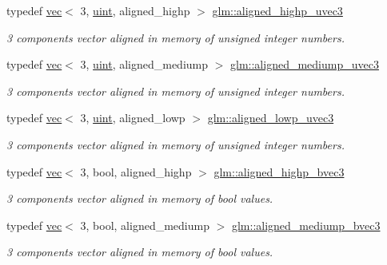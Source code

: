 \begin{DoxyCompactItemize}
typedef \mbox{\hyperlink{structglm_1_1vec}{vec}}$<$ 3, \mbox{\hyperlink{group__core__precision_ga4fd29415871152bfb5abd588334147c8}{uint}}, aligned\+\_\+highp $>$ \mbox{\hyperlink{group__gtc__type__aligned_ga1d303644825af6267389d6405f490ddc}{glm\+::aligned\+\_\+highp\+\_\+uvec3}}
\begin{DoxyCompactList}\small\item\em 3 components vector aligned in memory of unsigned integer numbers. \end{DoxyCompactList}\item 
typedef \mbox{\hyperlink{structglm_1_1vec}{vec}}$<$ 3, \mbox{\hyperlink{group__core__precision_ga4fd29415871152bfb5abd588334147c8}{uint}}, aligned\+\_\+mediump $>$ \mbox{\hyperlink{group__gtc__type__aligned_ga5d37a008051d20c6079933f0680b6521}{glm\+::aligned\+\_\+mediump\+\_\+uvec3}}
\begin{DoxyCompactList}\small\item\em 3 components vector aligned in memory of unsigned integer numbers. \end{DoxyCompactList}\item 
typedef \mbox{\hyperlink{structglm_1_1vec}{vec}}$<$ 3, \mbox{\hyperlink{group__core__precision_ga4fd29415871152bfb5abd588334147c8}{uint}}, aligned\+\_\+lowp $>$ \mbox{\hyperlink{group__gtc__type__aligned_gadaa291d4c8716193c6294d6e711eb071}{glm\+::aligned\+\_\+lowp\+\_\+uvec3}}
\begin{DoxyCompactList}\small\item\em 3 components vector aligned in memory of unsigned integer numbers. \end{DoxyCompactList}\item 
typedef \mbox{\hyperlink{structglm_1_1vec}{vec}}$<$ 3, bool, aligned\+\_\+highp $>$ \mbox{\hyperlink{group__gtc__type__aligned_ga224220a3fc5e5220141a568270cfb405}{glm\+::aligned\+\_\+highp\+\_\+bvec3}}
\begin{DoxyCompactList}\small\item\em 3 components vector aligned in memory of bool values. \end{DoxyCompactList}\item 
typedef \mbox{\hyperlink{structglm_1_1vec}{vec}}$<$ 3, bool, aligned\+\_\+mediump $>$ \mbox{\hyperlink{group__gtc__type__aligned_ga09e9fbc2d4dd00aa1319255fad4d7209}{glm\+::aligned\+\_\+mediump\+\_\+bvec3}}
\begin{DoxyCompactList}\small\item\em 3 components vector aligned in memory of bool values. \end{DoxyCompactList}\item 

\end{DoxyCompactItemize}

